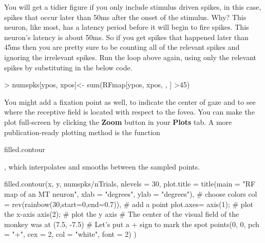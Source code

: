 \documentclass[
letterpaper, %
11pt, %
 oneside, 
onecolumn, %
]{memoir}
\numberwithin{Exercise}{chapter}
\begin{document}
You will get a tidier figure if you only include stimulus driven spikes, in this case, spikes that occur later than 50ms after the onset of the stimulus.  Why?  This neuron, like most, has a latency period before it will begin to fire spikes.  This neuron's latency is about 50ms.  So if you get spikes that happened later than 45ms then you are pretty sure to be counting all of the relevant spikes and ignoring the irrelevant spikes.  Run the loop above again, using only the relevant spikes by substituting in the below code.

\begin{shortrcode}
>   numspks[ypos, xpos]<- sum(RFmap[ypos, xpos, , ] >45)
\end{shortrcode}


You might add a fixation point as well, to indicate the center of gaze and to see where the receptive field is located with respect to the fovea. You can make the plot full-screen by clicking the \textbf{Zoom} button in your \textbf{Plots} tab. A more publication-ready plotting method is the function \begin{ttfamily}filled.contour\end{ttfamily}, which interpolates and smooths between the sampled points. 
\newline
\newline

\begin{shortrcode}
 filled.contour(x, y, numspks/nTrials, nlevels = 30,
               plot.title = title(main = "RF map of an MT neuron",
                                  xlab = "degrees", ylab = "degrees"),
               # choose colors
               col = rev(rainbow(30,start=0,end=0.7)),
               # add a point
               plot.axes={
                 axis(1); # plot the x-axis
                 axis(2); # plot the y axis
                 # The center of the visual field of the monkey was at (7.5, -7.5)
                 # Let's put a + sign to mark the spot
                 points(0, 0, pch = "+", cex = 2, col = "white", font = 2)}
               )
\end{shortrcode}
\end{document}
